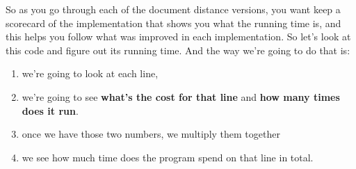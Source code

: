\documentclass{article}
\begin{document}
    So as you go through each of the document distance versions, you want keep a scorecard of the implementation that shows you what the running time is, and this helps you follow what was improved in each implementation.
    So let's look at this code and figure out its running time. 
    And the way we're going to do that is:
    \begin{enumerate}
        \item we're going to look at each line, 
        \item we're going to see \textbf{what's the cost for that line} and \textbf{how many times does it run}. 
        \item once we have those two numbers, we multiply them together 
        \item we see how much time does the program spend on that line in total.
    \end{enumerate}
     
\end{document}
